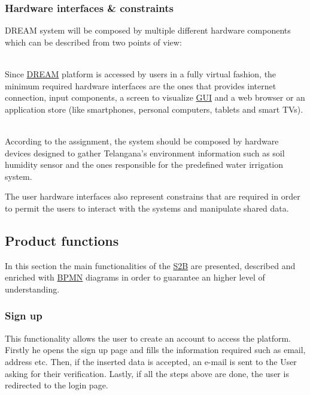 \subsubsection{Hardware interfaces \& constraints}
DREAM system will be composed by multiple different hardware components which can be described from two points of view:
\begin{description}[font=~\normalfont\scshape]
    \item[\textbf{\textcolor{myblue}{user perspective}}] \hfill \\Since \hyperref[tab:acronymsTable]{DREAM} platform is accessed by users in a fully virtual fashion, the minimum required hardware interfaces are the ones that provides internet connection, input components, a screen to visualize \hyperref[tab:acronymsTable]{GUI} and a web browser or an application store (like smartphones, personal computers, tablets and smart TVs).
    \item[\textbf{\textcolor{myblue}{system perspective}}] \hfill \\According to the assignment, the system should be composed by hardware devices designed to gather Telangana's environment information such as soil humidity sensor and the ones responsible for the predefined water irrigation system.
\end{description}
The user hardware interfaces also represent constrains that are required in order to permit the users to interact with the systems and manipulate shared data.

\subsection{Product functions}
\label{sec:product_functions}
In this section the main functionalities of the \hyperref[tab:acronymsTable]{S2B} are presented, described and enriched with \hyperref[tab:acronymsTable]{BPMN} diagrams in order to guarantee an higher level of understanding.
\subsubsection{Sign up}
This functionality allows the user to create an account to access the platform.
Firstly he opens the sign up page and fills the information required such as email, address etc.
Then, if the inserted data is accepted, an e-mail is sent to the User asking for their verification.
Lastly, if all the steps above are done, the user is redirected to the login page.

